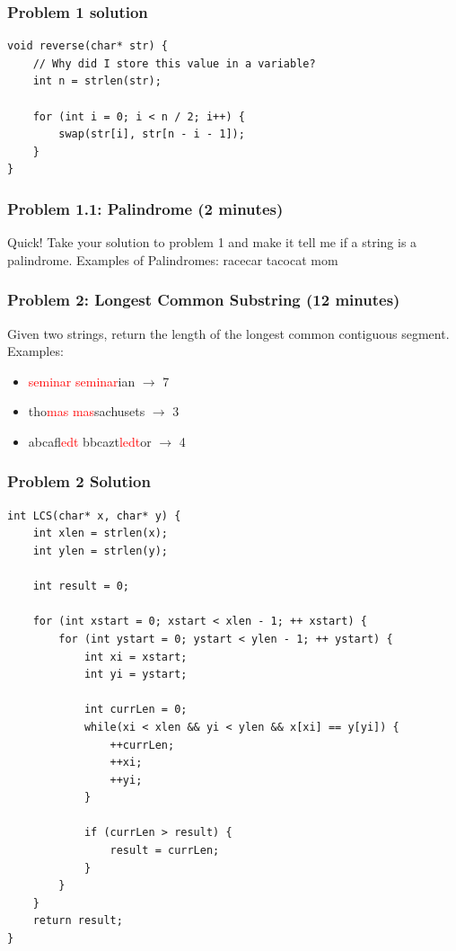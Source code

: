 \documentclass[aspectratio=169]{beamer}
\begin{document}
\begin{frame}[fragile]
    \frametitle{Problem 1 solution}
    \begin{lstlisting}
void reverse(char* str) {
    // Why did I store this value in a variable?
    int n = strlen(str);
  
    for (int i = 0; i < n / 2; i++) {
        swap(str[i], str[n - i - 1]); 
    }
} 
    \end{lstlisting}
\end{frame}
\begin{frame}
    \frametitle{Problem 1.1: Palindrome (2 minutes)}
    Quick! Take your solution to problem 1 and make it tell me if a string is a palindrome.
    \vfill{}
    Examples of Palindromes: racecar tacocat mom
\end{frame}
\begin{frame}
    \frametitle{Problem 2: Longest Common Substring (12 minutes)}

    Given two strings, return the length of the longest common contiguous segment.
    \vfill{}
    Examples:
    \begin{itemize}
        \item \textcolor{red}{seminar seminar}ian $\rightarrow$ 7
        \item tho\textcolor{red}{mas} \textcolor{red}{mas}sachusets $\rightarrow$ 3
        \item abcaf\textcolor{red}{ledt} bbcazt\textcolor{red}{ledt}or $\rightarrow$ 4
    \end{itemize}
\end{frame}
\begin{frame}[fragile]
    \frametitle{Problem 2 Solution}
    \begin{lstlisting}[basicstyle=\tiny]
int LCS(char* x, char* y) { 
    int xlen = strlen(x);
    int ylen = strlen(y);
    
    int result = 0;
  
    for (int xstart = 0; xstart < xlen - 1; ++ xstart) {
        for (int ystart = 0; ystart < ylen - 1; ++ ystart) {
            int xi = xstart;
            int yi = ystart;

            int currLen = 0;
            while(xi < xlen && yi < ylen && x[xi] == y[yi]) {
                ++currLen;
                ++xi;
                ++yi;
            }

            if (currLen > result) {
                result = currLen;
            }
        }
    }
    return result;
}
    \end{lstlisting}
\end{frame}
\end{document}

